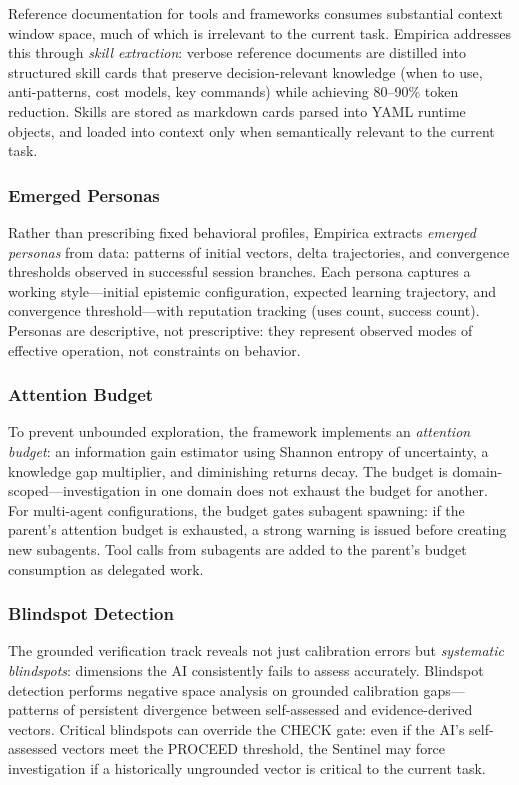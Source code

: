 Reference documentation for tools and frameworks consumes substantial context window space, much of which is irrelevant to the current task. Empirica addresses this through \emph{skill extraction}: verbose reference documents are distilled into structured skill cards that preserve decision-relevant knowledge (when to use, anti-patterns, cost models, key commands) while achieving 80--90\% token reduction. Skills are stored as markdown cards parsed into YAML runtime objects, and loaded into context only when semantically relevant to the current task.

\subsubsection{Emerged Personas}

Rather than prescribing fixed behavioral profiles, Empirica extracts \emph{emerged personas} from data: patterns of initial vectors, delta trajectories, and convergence thresholds observed in successful session branches. Each persona captures a working style---initial epistemic configuration, expected learning trajectory, and convergence threshold---with reputation tracking (uses count, success count). Personas are descriptive, not prescriptive: they represent observed modes of effective operation, not constraints on behavior.

\subsubsection{Attention Budget}

To prevent unbounded exploration, the framework implements an \emph{attention budget}: an information gain estimator using Shannon entropy of uncertainty, a knowledge gap multiplier, and diminishing returns decay. The budget is domain-scoped---investigation in one domain does not exhaust the budget for another. For multi-agent configurations, the budget gates subagent spawning: if the parent's attention budget is exhausted, a strong warning is issued before creating new subagents. Tool calls from subagents are added to the parent's budget consumption as delegated work.

\subsubsection{Blindspot Detection}

The grounded verification track reveals not just calibration errors but \emph{systematic blindspots}: dimensions the AI consistently fails to assess accurately. Blindspot detection performs negative space analysis on grounded calibration gaps---patterns of persistent divergence between self-assessed and evidence-derived vectors. Critical blindspots can override the CHECK gate: even if the AI's self-assessed vectors meet the PROCEED threshold, the Sentinel may force investigation if a historically ungrounded vector is critical to the current task.
